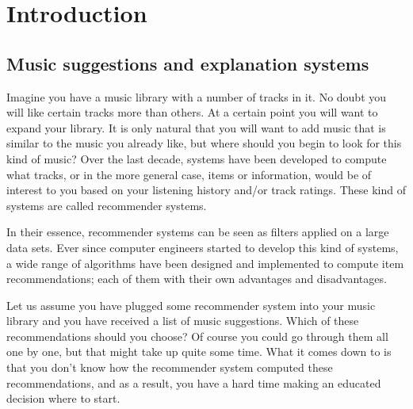 \chapter{Introduction}\label{chapter:introduction}


\section{Music suggestions and explanation systems}\label{chapter:introduction:section:context}

Imagine you have a music library with a number of tracks in it. No doubt you will like certain tracks more than others. At a certain point you will want to expand your library. It is only natural that you will want to add music that is similar to the music you already like, but where should you begin to look for this kind of music? Over the last decade, systems have been developed to compute what tracks, or in the more general case, items or information, would be of interest to you based on your listening history and/or track ratings. These kind of systems are called recommender systems.

In their essence, recommender systems can be seen as filters applied on a large data sets. Ever since computer engineers started to develop this kind of systems, a wide range of algorithms have been designed and implemented to compute item recommendations\cite{burke:2002, melville:2002:CCF:777092.777124, pazzani:2007:CRS:1768197.1768209, rajaraman:2012}; each of them with their own advantages and disadvantages.

Let us assume you have plugged some recommender system into your music library and you have received a list of music suggestions. Which of these recommendations should you choose? Of course you could go through them all one by one, but that might take up quite some time. What it comes down to is that you don't know how the recommender system computed these recommendations, and as a result, you have a hard time making an educated decision where to start.

